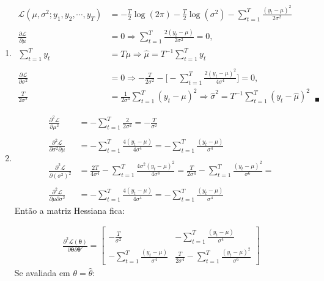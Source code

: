 \begin{enumerate}
	
	\begin{enumerate}
		\item %
		
		\begin{align*}
			\mathscr{L}(\mu, \sigma^2;y_1,y_2,\cdots,y_T)&=-\frac{T}{2}\log(2\pi)-\frac{T}{2}\log(\sigma^2)-\sum\limits_{t=1}^{T}\frac{(y_t-\mu)^2}{2\sigma^2}\\
			\\
			\frac{\partial \mathscr{L}}{\partial\mu}&=0\Rightarrow \sum\limits_{t=1}^{T}\frac{2(y_t-\mu)}{2\sigma^2}=0,\\
			\sum\limits_{t=1}^{T}y_t&=T\mu\Rightarrow\hat{\mu}=T^{-1}\sum\limits_{t=1}^{T}y_t\\
			\\
			\frac{\partial \mathscr{L}}{\partial\sigma^2}&=0\Rightarrow-\frac{T}{2\sigma^2}-\bigg[-\sum\limits_{t=1}^{T}\frac{2(y_t-\mu)^2}{4\sigma^4}\bigg]=0,\\
			\frac{T}{2\sigma^2}&=\frac{1}{2\sigma^4}\sum\limits_{t=1}^{T}(y_t-\mu)^2\Rightarrow\hat{\sigma}^2=T^{-1}\sum\limits_{t=1}^{T}(y_t-\hat{\mu})^2\;\;_\blacksquare
		\end{align*}
	
		\item %
		
		\begin{align*}
			\frac{\partial^2\mathscr{L}}{\partial\mu^2}&=-\sum\limits_{t=1}^T\frac{2}{2\sigma^2}=-\frac{T}{\sigma^2}\\
			\\
			\frac{\partial^2\mathscr{L}}{\partial\sigma^2\partial\mu}&=-\sum\limits_{t=1}^T\frac{4(y_t-\mu)}{4\sigma^4}=-\sum\limits_{t=1}^T\frac{(y_t-\mu)}{\sigma^4}\\
			\\
			\frac{\partial^2\mathscr{L}}{\partial(\sigma^2)^2}&=\frac{2T}{4\sigma^4}-\sum\limits_{t=1}^T\frac{4\sigma^2(y_t-\mu)^2}{4\sigma^8}=\frac{T}{2\sigma^4}-\sum\limits_{t=1}^T\frac{(y_t-\mu)^2}{\sigma^6}=\\
			\\
			\frac{\partial^2\mathscr{L}}{\partial\mu\partial\sigma^2}&=-\sum\limits_{t=1}^{T}\frac{4(y_t-\mu)}{4\sigma^4}=-\sum\limits_{t=1}^{T}\frac{(y_t-\mu)}{\sigma^4}
		\end{align*}
		Então a matriz Hessiana fica:
		
		\begin{align*}
			\frac{\partial^2 \mathscr{L}(\boldsymbol{\theta})}{\partial\boldsymbol{\theta}\partial\boldsymbol{\theta}'}=\begin{bmatrix}
				-\frac{T}{\sigma^2}&-\sum\limits_{t=1}^T\frac{(y_t-\mu)}{\sigma^4}\\
				-\sum\limits_{t=1}^T\frac{(y_t-\mu)}{\sigma^4}&\frac{T}{2\sigma^4}-\sum\limits_{t=1}^T\frac{(y_t-\mu)^2}{\sigma^6}
			\end{bmatrix}
		\end{align*}
		Se avaliada em $\theta=\hat{\theta}$:
		

\end{enumerate}
\end{enumerate}
